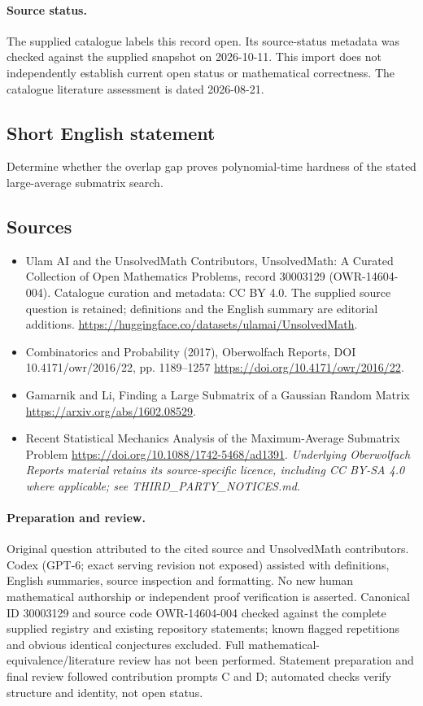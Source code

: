 \documentclass[11pt]{article}
\begin{document}
\paragraph{Source status.}
The supplied catalogue labels this record open. Its source-status metadata was checked against the supplied snapshot on 2026-10-11. This import does not independently establish current open status or mathematical correctness. The catalogue literature assessment is dated 2026-08-21.
\subsection{Short English statement}
Determine whether the overlap gap proves polynomial-time hardness of the stated large-average submatrix search.
\subsection{Sources}
\begin{itemize}
\item[\hypertarget{source:30003129:1}{S1}] Ulam AI and the UnsolvedMath Contributors, UnsolvedMath: A Curated Collection of Open Mathematics Problems, record 30003129 (OWR-14604-004). Catalogue curation and metadata: CC BY 4.0. The supplied source question is retained; definitions and the English summary are editorial additions.
\url{https://huggingface.co/datasets/ulamai/UnsolvedMath}.
\item[\hypertarget{source:30003129:2}{S2}] Combinatorics and Probability (2017), Oberwolfach Reports, DOI 10.4171/owr/2016/22, pp. 1189--1257
\url{https://doi.org/10.4171/owr/2016/22}.
\item[\hypertarget{source:30003129:3}{S3}] Gamarnik and Li, Finding a Large Submatrix of a Gaussian Random Matrix
\url{https://arxiv.org/abs/1602.08529}.
\item[\hypertarget{source:30003129:4}{S4}] Recent Statistical Mechanics Analysis of the Maximum-Average Submatrix Problem
\url{https://doi.org/10.1088/1742-5468/ad1391}.
\textit{Underlying Oberwolfach Reports material retains its source-specific licence, including CC BY-SA 4.0 where applicable; see THIRD\_PARTY\_NOTICES.md.}
\end{itemize}
\paragraph{Preparation and review.}
Original question attributed to the cited source and UnsolvedMath contributors. Codex (GPT-6; exact serving revision not exposed) assisted with definitions, English summaries, source inspection and formatting. No new human mathematical authorship or independent proof verification is asserted. Canonical ID 30003129 and source code OWR-14604-004 checked against the complete supplied registry and existing repository statements; known flagged repetitions and obvious identical conjectures excluded. Full mathematical-equivalence/literature review has not been performed. Statement preparation and final review followed contribution prompts C and D; automated checks verify structure and identity, not open status.
\label{end:30003129}
\end{document}
